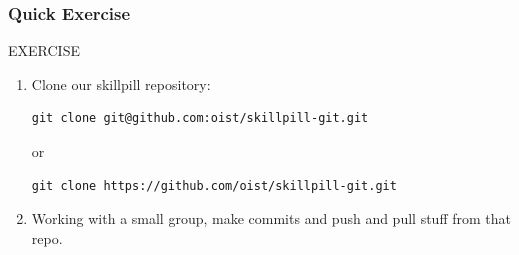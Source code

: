 \documentclass{beamer}
\begin{document}
\begin{frame}[fragile]
\frametitle{Quick Exercise}
    \begin{block}{EXERCISE}
        \begin{enumerate}
        \item Clone our skillpill repository:
        \begin{lstlisting}
git clone git@github.com:oist/skillpill-git.git
        \end{lstlisting}
        or
        \begin{lstlisting}
git clone https://github.com/oist/skillpill-git.git
        \end{lstlisting}
        \item Working with a small group, make commits and push and pull stuff from that repo.
        \end{enumerate}
    \end{block}

\end{frame}
\end{document}
